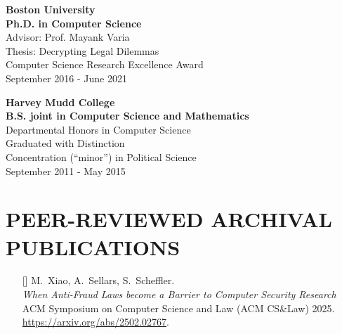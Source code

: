 \documentclass{res}
\begin{document}
\begin{resume}
    \textbf{Boston University} \\
    \textbf{Ph.D. in Computer Science} \\
    Advisor: Prof. Mayank Varia \\
    Thesis: Decrypting Legal Dilemmas \\
    Computer Science Research Excellence Award \\
    September 2016 - June 2021

    \textbf{Harvey Mudd College} \\
    \textbf{B.S. joint in Computer Science and Mathematics}  \\
    Departmental Honors in Computer Science \\
    Graduated with Distinction \\
    Concentration (``minor'') in Political Science \\
    September 2011 - May 2015

\section{PEER-REVIEWED ARCHIVAL PUBLICATIONS}
\vspace{0.25in}

\setcounter{citctr}{1}
\edef\fraudethics{[\arabic{citctr}]}
\edef\eeegroup{[\arabic{citctr}]}
\edef\csamimprovements{[\arabic{citctr}]}
\edef\eeesok{[\arabic{citctr}]}
\edef\foregoneVerif{[\arabic{citctr}]}
\edef\copyrightMDL{[\arabic{citctr}]}
\edef\turboikos{[\arabic{citctr}]}
\edef\booligero{[\arabic{citctr}]}
\edef\foregoneconclusion{[\arabic{citctr}]}
\edef\privateTranslation{[\arabic{citctr}]}
\edef\AEC{[\arabic{citctr}]}
\edef\pullingblocksJIP{[\arabic{citctr}]}
\edef\devicefingerprinting{[\arabic{citctr}]}
\edef\pullingblocks{[\arabic{citctr}]}
\edef\fairsibility{[\arabic{citctr}]}
\edef\emailspam{[\arabic{citctr}]}


\begin{itemize}
\item[\fraudethics] M.~Xiao, A.~Sellars, S.~Scheffler. \\
\emph{When Anti-Fraud Laws become a Barrier to Computer Security Research} \\
ACM Symposium on Computer Science and Law (ACM CS\&Law) 2025. \\
\url{https://arxiv.org/abs/2502.02767}.


\end{itemize}
\end{resume}
\end{document}
